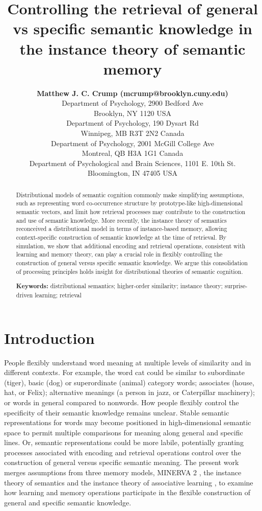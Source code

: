 \documentclass[10pt,letterpaper]{article}
\title{Controlling the retrieval of general vs specific semantic knowledge in the instance theory of semantic memory}
\author{{\large \bf Matthew J. C. Crump (mcrump@brooklyn.cuny.edu)} \\
  Department of Psychology, 2900 Bedford Ave \\
  Brooklyn, NY 1120 USA
  \AND {\large \bf Randall K. Jamieson (randy.jamieson@umanitoba.ca)} \\
  Department of Psychology, 190 Dysart Rd \\
  Winnipeg, MB R3T 2N2 Canada
  \AND {\large \bf Brendan T. Johns (brendan.johns@mcgill.ca)} \\
  Department of Psychology, 2001 McGill College Ave \\
  Montreal, QB H3A 1G1 Canada
  \AND {\large \bf Michael N. Jones (jonesmn@indiana.edu)} \\
  Department of Psychological and Brain Sciences, 1101 E. 10th St. \\
  Bloomington, IN 47405 USA}
\begin{document}
\maketitle


\begin{abstract}
Distributional models of semantic cognition commonly make simplifying assumptions, such as representing word co-occurrence structure by prototype-like high-dimensional semantic vectors, and limit how retrieval processes may contribute to the construction and use of semantic knowledge. More recently, the instance theory of semantics \cite<ITS, >{jamiesonInstanceTheorySemantic2018a} reconceived a distributional model in terms of instance-based memory, allowing context-specific construction of semantic knowledge at the time of retrieval. By simulation, we show that additional encoding and retrieval operations, consistent with learning and memory theory, can play a crucial role in flexibly controlling the construction of general versus specific semantic knowledge. We argue this consolidation of processing principles holds insight for distributional theories of semantic cognition.

\textbf{Keywords:}
distributional semantics; higher-order similarity; instance theory; surprise-driven learning; retrieval
\end{abstract}

\section{Introduction}\label{introduction}

People flexibly understand word meaning at multiple levels of similarity and in different contexts. For example, the word cat could be similar to subordinate (tiger), basic (dog) or superordinate (animal) category words; associates (house, hat, or Felix); alternative meanings (a person in jazz, or Caterpillar machinery); or words in general compared to nonwords. How people flexibly control the specificity of their semantic knowledge remains unclear. Stable semantic representations for words may become positioned in high-dimensional semantic space to permit multiple comparisons for meaning along general and specific lines. Or, semantic representations could be more labile, potentially granting processes associated with encoding and retrieval operations control over the construction of general versus specific semantic meaning. The present work merges assumptions from three memory models, MINERVA 2 \cite{hintzmanMINERVASimulationModel1984},  the instance theory of semantics \cite<ITS,>{jamiesonInstanceTheorySemantic2018a} and the instance theory of associative learning \cite<MINERVA-AL,>{jamiesonInstanceTheoryAssociative2012}, to examine how learning and memory operations participate in the flexible construction of general and specific semantic knowledge.
\end{document}
